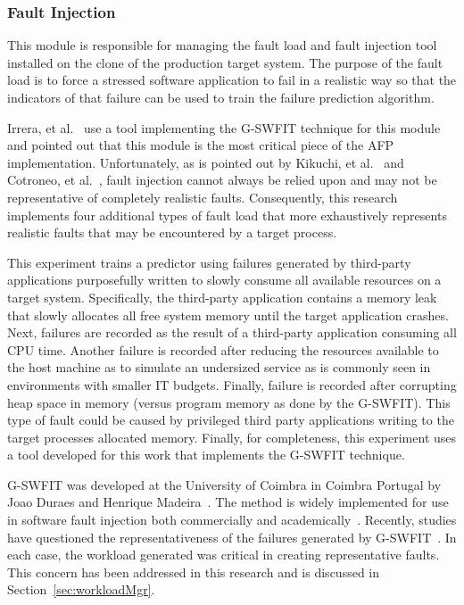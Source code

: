 \subsubsection{Fault Injection} \label{sec:faultInjectionMgr}
This module is responsible for managing the fault load and fault injection tool
installed on the clone of the production target system.  The purpose of the
fault load is to force a stressed software application to fail in a realistic
way so that the indicators of that failure can be used to train the failure
prediction algorithm.

Irrera, et al.~\cite{irrera2015} use a tool implementing the G-SWFIT technique
for this module and pointed out that this module is the most critical piece of
the AFP implementation.  Unfortunately, as is pointed out by Kikuchi, et
al.~\cite{kikuchi2014} and Cotroneo, et al.~\cite{cotroneo2012}, fault
injection cannot always be relied upon and may not be representative of
completely realistic faults.  Consequently, this research implements four
additional types of fault load that more exhaustively represents realistic
faults that may be encountered by a target process.  

This experiment trains a predictor using failures generated by third-party
applications purposefully written to slowly consume all available resources on
a target system.  Specifically, the third-party application contains a memory
leak that slowly allocates all free system memory until the target application
crashes.  Next, failures are recorded as the result of a third-party
application consuming all CPU time.  Another failure is recorded after reducing
the resources available to the host machine as to simulate an undersized
service as is commonly seen in environments with smaller IT budgets.  Finally,
failure is recorded after corrupting heap space in memory (versus program
memory as done by the G-SWFIT).  This type of fault could be caused by
privileged third party applications writing to the target processes allocated
memory.  Finally, for completeness, this experiment uses a tool developed for
this work that implements the G-SWFIT technique.

G-SWFIT was developed at the University of Coimbra in Coimbra Portugal by Joao
Duraes and Henrique Madeira~\cite{gswfit}.  The method is widely implemented
for use in software fault injection both commercially and
academically~\cite{natella2010,irrera2014,cotroneo2012,umadevi2015}.  Recently,
studies have questioned the representativeness of the failures generated by
G-SWFIT~\cite{kikuchi2014}.  In each case, the workload generated was critical
in creating representative faults.  This concern has been addressed in this
research and is discussed in Section~\ref{sec:workloadMgr}.

